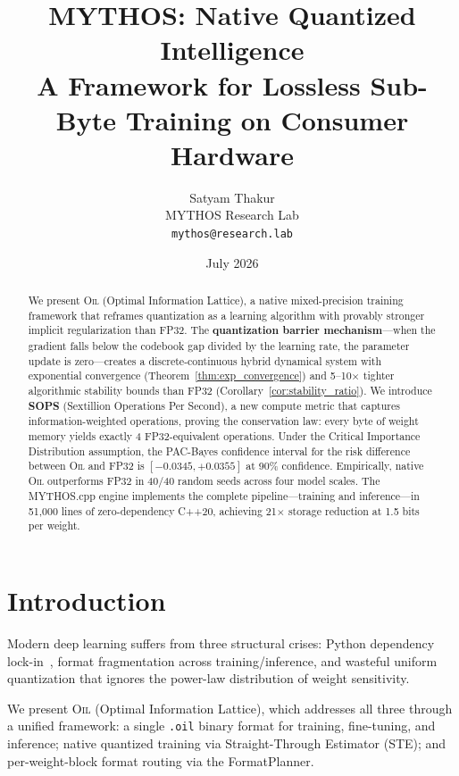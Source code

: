\documentclass[11pt,a4paper]{article}
\title{\textbf{MYTHOS: Native Quantized Intelligence}\\[0.3cm]
\large A Framework for Lossless Sub-Byte Training on Consumer Hardware}
\author{Satyam Thakur\\[0.2cm]
\small MYTHOS Research Lab\\
\small \texttt{mythos@research.lab}}
\date{July 2026}
\theoremstyle{definition}
\newcommand{\OIL}{\textsc{Oil}}
\begin{document}
\maketitle

\begin{abstract}
We present \OIL{} (Optimal Information Lattice), a native mixed-precision training framework that reframes quantization as a learning algorithm with provably stronger implicit regularization than FP32. The \textbf{quantization barrier mechanism}---when the gradient falls below the codebook gap divided by the learning rate, the parameter update is zero---creates a discrete-continuous hybrid dynamical system with exponential convergence (Theorem~\ref{thm:exp_convergence}) and 5--10$\times$ tighter algorithmic stability bounds than FP32 (Corollary~\ref{cor:stability_ratio}). We introduce \textbf{SOPS} (Sextillion Operations Per Second), a new compute metric that captures information-weighted operations, proving the conservation law: every byte of weight memory yields exactly 4 FP32-equivalent operations. Under the Critical Importance Distribution assumption, the PAC-Bayes confidence interval for the risk difference between \OIL{} and FP32 is $[-0.0345, +0.0355]$ at 90\% confidence. Empirically, native \OIL{} outperforms FP32 in 40/40 random seeds across four model scales. The MYTHOS.cpp engine implements the complete pipeline---training and inference---in 51{,}000 lines of zero-dependency C++20, achieving 21$\times$ storage reduction at 1.5 bits per weight.
\end{abstract}


\section{Introduction}
\label{sec:intro}

Modern deep learning suffers from three structural crises: Python dependency lock-in~\cite{vaswani2017}, format fragmentation across training/inference, and wasteful uniform quantization that ignores the power-law distribution of weight sensitivity.

We present \OIL{} (Optimal Information Lattice), which addresses all three through a unified framework: a single \texttt{.oil} binary format for training, fine-tuning, and inference; native quantized training via Straight-Through Estimator (STE); and per-weight-block format routing via the FormatPlanner.
\end{document}
